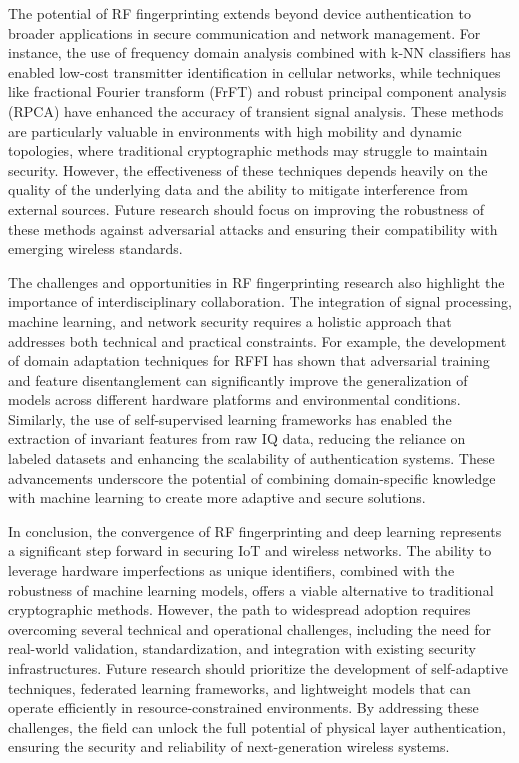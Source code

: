 \documentclass[conference]{IEEEtran}
\begin{document}
The potential of RF fingerprinting extends beyond device authentication to broader applications in secure communication and network management. For instance, the use of frequency domain analysis combined with k-NN classifiers has enabled low-cost transmitter identification in cellular networks, while techniques like fractional Fourier transform (FrFT) and robust principal component analysis (RPCA) have enhanced the accuracy of transient signal analysis. These methods are particularly valuable in environments with high mobility and dynamic topologies, where traditional cryptographic methods may struggle to maintain security. However, the effectiveness of these techniques depends heavily on the quality of the underlying data and the ability to mitigate interference from external sources. Future research should focus on improving the robustness of these methods against adversarial attacks and ensuring their compatibility with emerging wireless standards.  

The challenges and opportunities in RF fingerprinting research also highlight the importance of interdisciplinary collaboration. The integration of signal processing, machine learning, and network security requires a holistic approach that addresses both technical and practical constraints. For example, the development of domain adaptation techniques for RFFI has shown that adversarial training and feature disentanglement can significantly improve the generalization of models across different hardware platforms and environmental conditions. Similarly, the use of self-supervised learning frameworks has enabled the extraction of invariant features from raw IQ data, reducing the reliance on labeled datasets and enhancing the scalability of authentication systems. These advancements underscore the potential of combining domain-specific knowledge with machine learning to create more adaptive and secure solutions.  

In conclusion, the convergence of RF fingerprinting and deep learning represents a significant step forward in securing IoT and wireless networks. The ability to leverage hardware imperfections as unique identifiers, combined with the robustness of machine learning models, offers a viable alternative to traditional cryptographic methods. However, the path to widespread adoption requires overcoming several technical and operational challenges, including the need for real-world validation, standardization, and integration with existing security infrastructures. Future research should prioritize the development of self-adaptive techniques, federated learning frameworks, and lightweight models that can operate efficiently in resource-constrained environments. By addressing these challenges, the field can unlock the full potential of physical layer authentication, ensuring the security and reliability of next-generation wireless systems.
\end{document}
